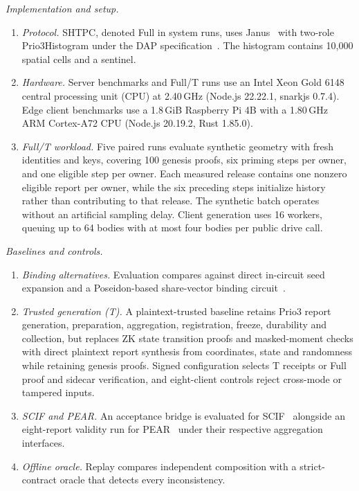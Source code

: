 \documentclass[conference,compsoc]{IEEEtran}
\theoremstyle{definition}
\numberwithin{equation}{section}
\numberwithin{table}{section}
\numberwithin{figure}{section}
\theoremstyle{plain}
\begin{document}
\emph{Implementation and setup.}
\begin{enumerate}
\setlength{\itemsep}{0pt}\setlength{\parskip}{0pt}\setlength{\topsep}{0pt}
\item \emph{Protocol.} SHTPC, denoted Full in system runs, uses Janus~\cite{ISRGJanus} with two-role Prio3Histogram under the DAP specification~\cite{Geoghegan2023DAP09,Barnes2023VDAF08}. The histogram contains 10,000 spatial cells and a sentinel.
\item \emph{Hardware.} Server benchmarks and Full/T runs use an Intel Xeon Gold 6148 central processing unit (CPU) at 2.40\,GHz (Node.js 22.22.1, snarkjs 0.7.4). Edge client benchmarks use a 1.8\,GiB Raspberry Pi 4B with a 1.80\,GHz ARM Cortex-A72 CPU (Node.js 20.19.2, Rust 1.85.0).
\item \emph{Full/T workload.} Five paired runs evaluate synthetic geometry with fresh identities and keys, covering 100 genesis proofs, six priming steps per owner, and one eligible step per owner. Each measured release contains one nonzero eligible report per owner, while the six preceding steps initialize history rather than contributing to that release. The synthetic batch operates without an artificial sampling delay. Client generation uses 16 workers, queuing up to 64 bodies with at most four bodies per public drive call.
\end{enumerate}

\emph{Baselines and controls.}
\begin{enumerate}
\setlength{\itemsep}{0pt}\setlength{\parskip}{0pt}\setlength{\topsep}{0pt}
\item \emph{Binding alternatives.} Evaluation compares against direct in-circuit seed expansion and a Poseidon-based share-vector binding circuit~\cite{Grassi2021Poseidon}.
\item \emph{Trusted generation (T).} A plaintext-trusted baseline retains Prio3 report generation, preparation, aggregation, registration, freeze, durability and collection, but replaces ZK state transition proofs and masked-moment checks with direct plaintext report synthesis from coordinates, state and randomness while retaining genesis proofs. Signed configuration selects T receipts or Full proof and sidecar verification, and eight-client controls reject cross-mode or tampered inputs.
\item \emph{SCIF and PEAR.} An acceptance bridge is evaluated for SCIF~\cite{Su2025SCIF} alongside an eight-report validity run for PEAR~\cite{Acharya2025PEAR} under their respective aggregation interfaces.
\item \emph{Offline oracle.} Replay compares independent composition with a strict-contract oracle that detects every inconsistency.
\end{enumerate}
\end{document}
